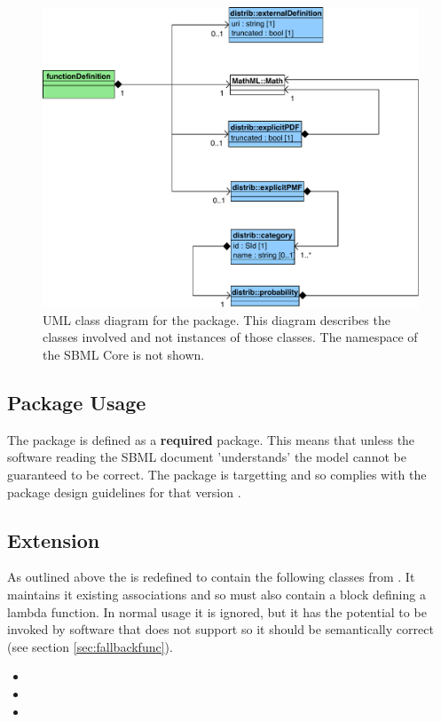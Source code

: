 \documentclass[draftspec]{sbmlpkgspec}
\begin{document}
\begin{figure}[htb]
\includegraphics[width=0.75\linewidth]{DistribUMLModel.pdf}
\caption{UML class diagram for the \distrib package. This diagram
  describes the classes involved and not instances of those
  classes. The namespace of the SBML Core is not shown.}
\label{fig:umlmodel}
\end{figure}

\subsection{Package Usage}

The \distrib package is defined as a \textbf{required} package. This
means that unless the software reading the SBML document 'understands'
\distribshort the model cannot be guaranteed to be correct. The
package is targetting \sbmlverone and so complies with the package
design guidelines for that version \cite{sbmll3v1packrule}.

\subsection{\FunctionDefinition Extension}

As outlined above the \FunctionDefinition is redefined to contain the
following classes from \distribshort. It maintains it existing
associations and so must also contain a \mathml block defining a
lambda function. In normal usage it is ignored, but it has the
potential to be invoked by software that does not support \distribshort
so it should be semantically correct (see section \ref{sec:fallbackfunc}).

\begin{itemize}
  \item {}
  \item {}
  \item {}
\end{itemize}
\end{document}
